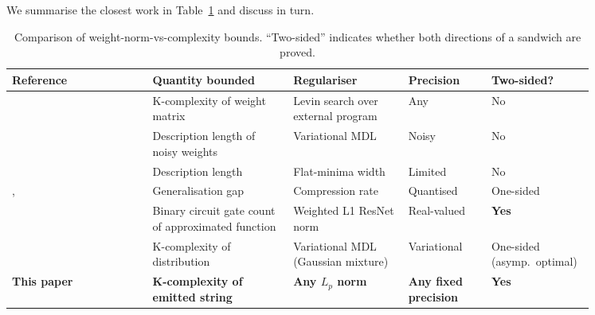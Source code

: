 \documentclass{article}
\theoremstyle{definition}
\begin{document}
We summarise the closest work in Table~\ref{tab:related} and discuss in turn.

\begin{table}[h]
  \caption{Comparison of weight-norm-vs-complexity bounds. ``Two-sided'' indicates whether both directions of a sandwich are proved.}
  \label{tab:related}
  \centering
  \small
  \begin{tabular}{p{0.22\linewidth}p{0.22\linewidth}p{0.18\linewidth}p{0.13\linewidth}p{0.10\linewidth}}
    \toprule
    \textbf{Reference}                                    & \textbf{Quantity bounded}                          & \textbf{Regulariser}               & \textbf{Precision}           & \textbf{Two-sided?}         \\
    \midrule
    \citet{schmidhuber1997discovering}                    & K-complexity of weight matrix                      & Levin search over external program & Any                          & No                          \\
    \citet{hinton1993keeping}                             & Description length of noisy weights                & Variational MDL                    & Noisy                        & No                          \\
    \citet{hochreiter1997flat}                            & Description length                                 & Flat-minima width                  & Limited                      & No                          \\
    \citet{arora2018stronger}, \citet{lotter2022pacbayes} & Generalisation gap                                 & Compression rate                   & Quantised                    & One-sided                   \\
    \citet{jacot2025deep}                                 & Binary circuit gate count of approximated function & Weighted L1 ResNet norm            & Real-valued                  & \textbf{Yes}                \\
    \citet{shaw2026bridging}                              & K-complexity of distribution                       & Variational MDL (Gaussian mixture) & Variational                  & One-sided (asymp.\ optimal) \\
    \midrule
    \textbf{This paper}                                   & \textbf{K-complexity of emitted string}            & \textbf{Any $L_p$ norm}            & \textbf{Any fixed precision} & \textbf{Yes}                \\
    \bottomrule
  \end{tabular}
\end{table}
\end{document}

